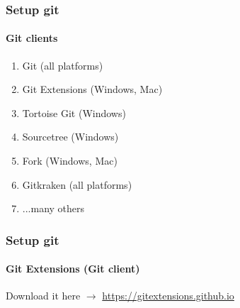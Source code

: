 \documentclass[aspectratio=169]{beamer}
\newcommand{\adjustimg}{%
  \checkoddpage%
  \ifoddpage\hspace*{\dimexpr\evensidemargin-\oddsidemargin}\else\hspace*{-\dimexpr\evensidemargin-\oddsidemargin}\fi%
}
\newcommand{\centerimg}[2][width=\textwidth]{%
  \makebox[\textwidth]{\adjustimg\texttt{[image: \#2]}}%
}
\begin{document}
    \begin{frame}
        \frametitle{Setup git}
        \framesubtitle{Git clients}
        \begin{enumerate}
            \item Git (all platforms)
            \item Git Extensions (Windows, Mac)
            \item Tortoise Git (Windows)
            \item Sourcetree (Windows)
            \item Fork (Windows, Mac)
            \item Gitkraken (all platforms)
            \item ...many others
        \end{enumerate}
    \end{frame}
    \begin{frame}
        \frametitle{Setup git}
        \framesubtitle{Git Extensions (Git client)}
        \noindent\centerimg[width=0.8\paperwidth]{gitex.png} 
        Download it here $\rightarrow$ \url{https://gitextensions.github.io}
    \end{frame}
\end{document}

